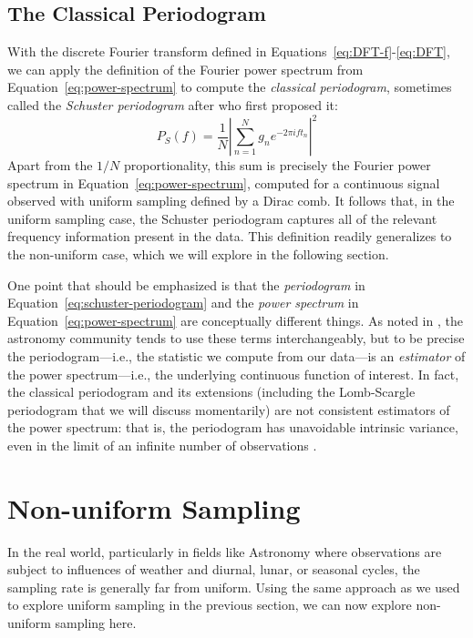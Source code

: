 \documentclass[preprint]{aastex}
\newcommand{\Eq}[1]{Equation~\ref{eq:#1}}
\newcommand{\eq}[1]{\Eq{#1}}
\newcommand{\eqs}[2]{Equations~\ref{eq:#1}-\ref{eq:#2}}
\newcommand{\eqlabel}[1]{\label{eq:#1}}
\newcommand{\sectlabel}[1]{\label{sect:#1}}
\begin{document}
\subsection{The Classical Periodogram}

With the discrete Fourier transform defined in \eqs{DFT-f}{DFT}, we can
apply the definition of the Fourier power spectrum from \eq{power-spectrum}
to compute the {\it classical periodogram}, sometimes called the
{\it Schuster periodogram} after \citet{Schuster98} who first proposed it:
\begin{equation}
  P_S(f) = \frac{1}{N}\left|\sum_{n=1}^N g_n e^{-2\pi i f t_n}\right|^2
  \eqlabel{schuster-periodogram}
\end{equation}
Apart from the $1/N$ proportionality, this sum is precisely the Fourier power
spectrum in \eq{power-spectrum}, computed for a continuous signal observed
with uniform sampling defined by a Dirac comb.
It follows that, in the uniform sampling case, the Schuster periodogram
captures all of the relevant frequency information present in the data.
This definition readily generalizes to the non-uniform case, which we
will explore in the following section.

One point that should be emphasized is that the {\it periodogram} in
\eq{schuster-periodogram} and the {\it power spectrum} in \eq{power-spectrum}
are conceptually different things.
As noted in \citet{Scargle82}, the astronomy community tends to use these
terms interchangeably, but to be precise
the periodogram---i.e., the statistic we compute from our data---is an
{\it estimator} of the power spectrum---i.e., the underlying continuous
function of interest.
In fact, the classical periodogram and its extensions (including the
Lomb-Scargle periodogram that we will discuss momentarily)
are not consistent estimators of the power spectrum: that is, the periodogram
has unavoidable intrinsic variance, even in the limit of an infinite number
of observations
\citep[for a detailed discussion, see Chapter 8.4 of][]{Anderson1971}.


\section{Non-uniform Sampling}
\sectlabel{non-uniform-sampling}

In the real world, particularly in fields like Astronomy where observations are
subject to influences of weather and diurnal, lunar, or seasonal cycles, the
sampling rate is generally far from uniform.
Using the same approach as we used to explore uniform sampling in the previous
section, we can now explore non-uniform sampling here.
\end{document}
